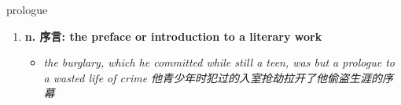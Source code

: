 
\begin{frame}
{\huge prologue}
\begin{center}
\begin{enumerate}\Large
  \item \textbf{n. 序言: the preface or introduction to a literary work}
  \begin{itemize}
    \item \em{\Large{the burglary, which he committed while still a teen, was but a prologue to a wasted life of crime 他青少年时犯过的入室抢劫拉开了他偷盗生涯的序幕}}
  \end{itemize}
\end{enumerate}
\end{center}
\end{frame}

